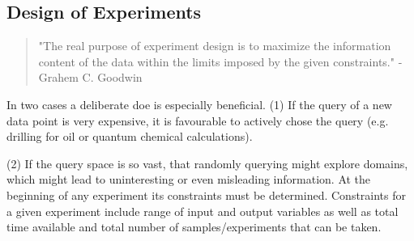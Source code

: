 \subsection{Design of Experiments} %
%
\begin{quote}
	{"The real purpose of experiment design is to maximize the information content of the data within the limits imposed by the given constraints."}
	- {Grahem C. Goodwin\cite{goodwin1977experiment}}
\end{quote}
%
In two cases a deliberate \gls{doe} is especially beneficial.
(1) If the query of a new data point is very expensive, it is favourable to actively chose the query (e.g. drilling for oil or quantum chemical calculations). 

(2) If the query space is so vast, that randomly querying might explore domains, which might lead to uninteresting or even misleading information.
% 
At the beginning of any experiment its constraints must be determined. 
%
Constraints for a given experiment include range of input and output variables as well as total time available and total number of samples/experiments that can be taken\cite{goodwin1977experiment}.

